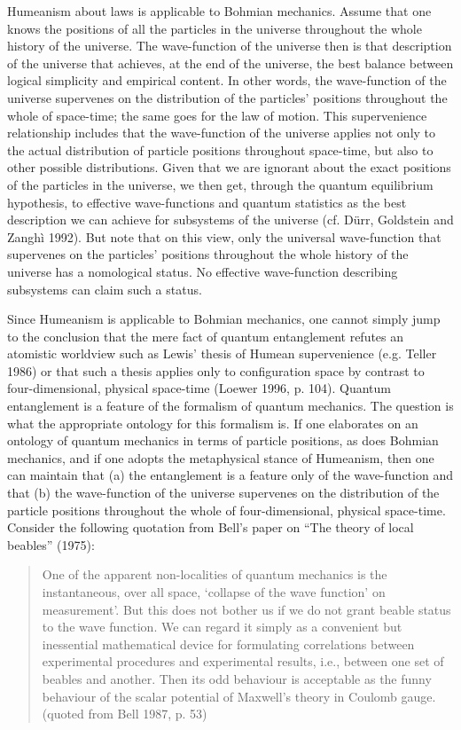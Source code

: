 \documentclass[12pt]{article}
\theoremstyle{definition}
\begin{document}
Humeanism about laws is applicable to Bohmian mechanics. Assume that one knows the positions of all the particles in the universe throughout the whole history of the universe. The wave-function of the universe then is that description of the universe that achieves, at the end of the universe, the best balance between logical simplicity and empirical content. In other words, the wave-function of the universe supervenes on the distribution of the particles' positions throughout the whole of space-time; the same goes for the law of motion. This supervenience relationship includes that the wave-function of the universe applies not only to the actual distribution of particle positions throughout space-time, but also to other possible distributions. Given that we are ignorant about the exact positions of the particles in the universe, we then get, through the quantum equilibrium hypothesis, to effective wave-functions and quantum statistics as the best description we can achieve for subsystems of the universe (cf. D\"urr, Goldstein and Zangh\`i 1992). But note that on this view, only the universal wave-function that supervenes on the particles' positions throughout the whole history of the universe has a nomological status. No effective wave-function describing subsystems can claim such a status.

Since Humeanism is applicable to Bohmian mechanics, one cannot simply jump to the conclusion that the mere fact of quantum entanglement refutes an atomistic worldview such as Lewis' thesis of Humean supervenience (e.g. Teller 1986) or that such a thesis applies only to configuration space by contrast to four-dimensional, physical space-time (Loewer 1996, p. 104). Quantum entanglement is a feature of the formalism of quantum mechanics. The question is what the appropriate ontology for this formalism is. If one elaborates on an ontology of quantum mechanics in terms of particle positions, as does Bohmian mechanics, and if one adopts the metaphysical stance of Humeanism, then one can maintain that (a) the entanglement is a feature only of the wave-function and that (b) the wave-function of the universe supervenes on the distribution of the particle positions throughout the whole of four-dimensional, physical space-time. Consider the following quotation from Bell's paper on ``The theory of local beables'' (1975):

\begin{quote}One of the apparent non-localities of quantum mechanics is the instantaneous, over all space, `collapse of the wave function' on measurement'. But this does not bother us if we do not grant beable status to the wave function. We can regard it simply as a convenient but inessential mathematical device for formulating correlations between experimental procedures and experimental results, i.e., between one set of beables and another. Then its odd behaviour is acceptable as the funny behaviour of the scalar potential of Maxwell's theory in Coulomb gauge. (quoted from Bell 1987, p. 53)\end{quote}
\end{document}
